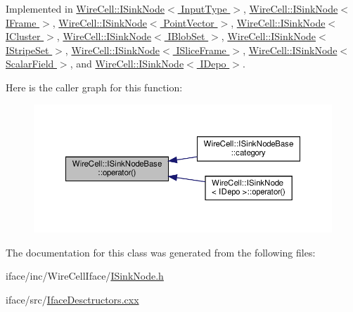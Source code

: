Implemented in \hyperlink{class_wire_cell_1_1_i_sink_node_a793d39beb4d1ab8c3f4639ce1aa337d9}{Wire\+Cell\+::\+I\+Sink\+Node$<$ Input\+Type $>$}, \hyperlink{class_wire_cell_1_1_i_sink_node_a793d39beb4d1ab8c3f4639ce1aa337d9}{Wire\+Cell\+::\+I\+Sink\+Node$<$ I\+Frame $>$}, \hyperlink{class_wire_cell_1_1_i_sink_node_a793d39beb4d1ab8c3f4639ce1aa337d9}{Wire\+Cell\+::\+I\+Sink\+Node$<$ Point\+Vector $>$}, \hyperlink{class_wire_cell_1_1_i_sink_node_a793d39beb4d1ab8c3f4639ce1aa337d9}{Wire\+Cell\+::\+I\+Sink\+Node$<$ I\+Cluster $>$}, \hyperlink{class_wire_cell_1_1_i_sink_node_a793d39beb4d1ab8c3f4639ce1aa337d9}{Wire\+Cell\+::\+I\+Sink\+Node$<$ I\+Blob\+Set $>$}, \hyperlink{class_wire_cell_1_1_i_sink_node_a793d39beb4d1ab8c3f4639ce1aa337d9}{Wire\+Cell\+::\+I\+Sink\+Node$<$ I\+Stripe\+Set $>$}, \hyperlink{class_wire_cell_1_1_i_sink_node_a793d39beb4d1ab8c3f4639ce1aa337d9}{Wire\+Cell\+::\+I\+Sink\+Node$<$ I\+Slice\+Frame $>$}, \hyperlink{class_wire_cell_1_1_i_sink_node_a793d39beb4d1ab8c3f4639ce1aa337d9}{Wire\+Cell\+::\+I\+Sink\+Node$<$ Scalar\+Field $>$}, and \hyperlink{class_wire_cell_1_1_i_sink_node_a793d39beb4d1ab8c3f4639ce1aa337d9}{Wire\+Cell\+::\+I\+Sink\+Node$<$ I\+Depo $>$}.

Here is the caller graph for this function\+:
\nopagebreak
\begin{figure}[H]
\begin{center}
\leavevmode
\includegraphics[width=350pt]{class_wire_cell_1_1_i_sink_node_base_a449038481c2f511bcfa7c7bf77641069_icgraph}
\end{center}
\end{figure}


The documentation for this class was generated from the following files\+:\begin{DoxyCompactItemize}
\item 
iface/inc/\+Wire\+Cell\+Iface/\hyperlink{_i_sink_node_8h}{I\+Sink\+Node.\+h}\item 
iface/src/\hyperlink{_iface_desctructors_8cxx}{Iface\+Desctructors.\+cxx}\end{DoxyCompactItemize}
